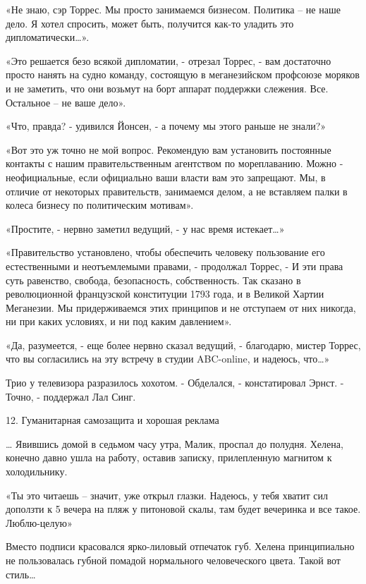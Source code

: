 \documentclass{book}
\begin{document}
«Не знаю, сэр Торрес. Мы просто занимаемся бизнесом. Политика – не наше дело. Я хотел спросить, может быть, получится как-то уладить это дипломатически\ldots{}».

«Это решается безо всякой дипломатии, - отрезал Торрес, - вам достаточно просто нанять на судно команду, состоящую в меганезийском профсоюзе моряков и не заметить, что они возьмут на борт аппарат поддержки слежения. Все. Остальное – не ваше дело».

«Что, правда? - удивился Йонсен, - а почему мы этого раньше не знали?»

«Вот это уж точно не мой вопрос. Рекомендую вам установить постоянные контакты с нашим правительственным агентством по мореплаванию. Можно - неофициальные, если официально ваши власти вам это запрещают. Мы, в отличие от некоторых правительств, занимаемся делом, а не вставляем палки в колеса бизнесу по политическим мотивам».

«Простите, - нервно заметил ведущий, - у нас время истекает\ldots{}»

«Правительство установлено, чтобы обеспечить человеку пользование его естественными и неотъемлемыми правами, - продолжал Торрес, - И эти права суть равенство, свобода, безопасность, собственность. Так сказано в революционной французской конституции 1793 года, и в Великой Хартии Меганезии. Мы придерживаемся этих принципов и не отступаем от них никогда, ни при каких условиях, и ни под каким давлением».

«Да, разумеется, - еще более нервно сказал ведущий, - благодарю, мистер Торрес, что вы согласились на эту встречу в студии ABC-online, и надеюсь, что\ldots{}»

Трио у телевизора разразилось хохотом.
- Обделался, - констатировал Эрнст.
- Точно, - поддержал Лал Синг.



12. Гуманитарная самозащита и хорошая реклама


\ldots{} Явившись домой в седьмом часу утра, Малик, проспал до полудня. Хелена, конечно давно ушла на работу, оставив записку, прилепленную магнитом к холодильнику.

«Ты это читаешь – значит, уже открыл глазки. Надеюсь, у тебя хватит сил доползти к 5 вечера на пляж у питоновой скалы, там будет вечеринка и все такое. Люблю-целую»

Вместо подписи красовался ярко-лиловый отпечаток губ. Хелена принципиально не пользовалась губной помадой нормального человеческого цвета. Такой вот стиль\ldots{}
\end{document}
